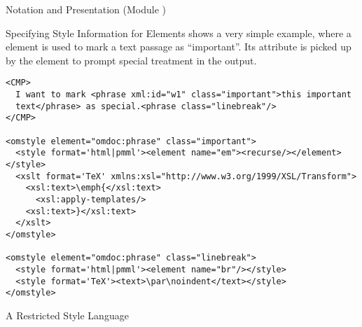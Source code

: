 \begin{tchapter}[id=pres,short=Notation and Presentation]{Notation and Presentation (Module {})}
\begin{tsection}[id=omstyle,short=Styling OMDoc Elements]{Specifying Style Information for {\omdoc} Elements}
{} shows a very simple example, where a {} element is used to
mark a text passage as ``important''. Its {} attribute is picked
up by the {} element to prompt special treatment in the output.

\begin{lstlisting}[label=lst:phrase,
  caption={Specifying Style Information with the {\element{phrase}}
    Element.},index={omstyle,style,xslt,element,text,recurse,}]
<CMP>
  I want to mark <phrase xml:id="w1" class="important">this important
  text</phrase> as special.<phrase class="linebreak"/>
</CMP>

<omstyle element="omdoc:phrase" class="important">
  <style format='html|pmml'><element name="em"><recurse/></element></style>
  <xslt format='TeX' xmlns:xsl="http://www.w3.org/1999/XSL/Transform">
    <xsl:text>\emph{</xsl:text>
      <xsl:apply-templates/>
    <xsl:text>}</xsl:text>
  </xslt>
</omstyle>

<omstyle element="omdoc:phrase" class="linebreak">
  <style format='html|pmml'><element name="br"/></style>
  <style format='TeX'><text>\par\noindent</text></style>
</omstyle>
\end{lstlisting}
\end{tsection}

\begin{tsection}[id=style]{A Restricted Style Language}
  

\end{tsection}
\end{tchapter}
